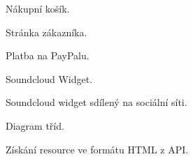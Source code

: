 \documentclass[12pt]{article}
\begin{document}
\begin{figure}[h!]
  \caption{Nákupní košík.} \label{pic:cart}
\end{figure}

\begin{figure}[h!]
  \caption{Stránka zákazníka.} \label{pic:trackview}
\end{figure}

\begin{figure}[h!]
  \caption{Platba na PayPalu.} \label{pic:paypal}
\end{figure}

\begin{figure}[h!]
  \caption{Soundcloud Widget.} \label{pic:widget}
\end{figure}

\begin{figure}[h!]
  \caption{Soundcloud widget sdílený na sociální síti.} \label{pic:widgetfb}
\end{figure}

\begin{figure}[h!]
  \caption{Diagram tříd.} \label{pic:classdia}
\end{figure}

\begin{figure}[h!]
  \caption{Získání resource ve formátu HTML z API.} \label{pic:apihtml}
\end{figure}
\end{document}
